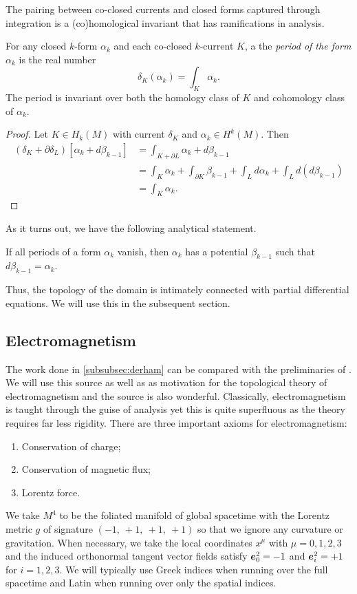 \documentclass[conf]{new-aiaa}
\begin{document}
The pairing between co-closed currents and closed forms captured through integration is a (co)homological invariant that has ramifications in analysis.
\begin{proposition}
\label{def:period}
For any closed $k$-form $\alpha_k$ and each co-closed $k$-current $K$, a the \emph{period of the form $\alpha_k$} is the real number
\begin{equation}
\delta_K(\alpha_k)=\int_K \alpha_k.
\end{equation}
The period is invariant over both the homology class of $K$ and cohomology class of $\alpha_k$.
\end{proposition}
\begin{proof}
Let $K \in H_k(M)$ with current $\delta_K$ and $\alpha_k \in H^k(M)$. Then
\begin{align}
(\delta_K+\partial \delta_L)[\alpha_k + d \beta_{k-1}] &= \int_{K+\partial L} \alpha_k + d\beta_{k-1}\\
&= \int_K \alpha_k + \int_{\partial K} \beta_{k-1} + \int_L d \alpha_k + \int_L d(d\beta_{k-1})\\
&= \int_K \alpha_k.
\end{align}
\end{proof}
As it turns out, we have the following analytical statement.
\begin{proposition}
\label{prop:periods}
    If all periods of a form $\alpha_k$ vanish, then $\alpha_k$ has a potential $\beta_{k-1}$ such that $d\beta_{k-1}=\alpha_k$.
\end{proposition}
Thus, the topology of the domain is intimately connected with partial differential equations. We will use this in the subsequent section.

\subsection{Electromagnetism}

The work done in \cref{subsubsec:derham} can be compared with the preliminaries of \cite{delphenich_axioms_2005}. We will use this source as well as \cite{hehl_introduction_2003} as motivation for the topological theory of electromagnetism and the source \cite{gross_electromagnetic_2004} is also wonderful. Classically, electromagnetism is taught through the guise of analysis yet this is quite superfluous as the theory requires far less rigidity. There are three important axioms for electromagnetism:
\begin{enumerate}
    \item Conservation of charge;
    \item Conservation of magnetic flux;
    \item Lorentz force.
\end{enumerate}
We take $M^4$ to be the foliated manifold of global spacetime with the Lorentz metric $g$ of signature $(-1, ~+1,~+1,~+1)$ so that we ignore any curvature or gravitation. When necessary, we take the local coordinates $x^\mu$ with $\mu=0,1,2,3$ and the induced orthonormal tangent vector fields satisfy $\boldsymbol{e}_0^2 = -1$ and $\boldsymbol{e}_i^2=+1$ for $i=1,2,3$. We will typically use Greek indices when running over the full spacetime and Latin when running over only the spatial indices.
\end{document}
